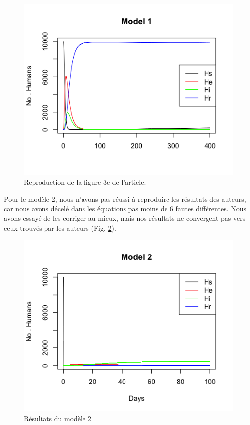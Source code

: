 \documentclass[
  12pt,
  french,
  oneside]{article}
\begin{document}
\begin{figure}
\hypertarget{fig:model1}{%
\centering
\includegraphics{figures/Model1.png}
\caption{Reproduction de la figure 3c de l'article.}\label{fig:model1}
}
\end{figure}

Pour le modèle 2, nous n'avons pas réussi à reproduire les résultats des
auteurs, car nous avons décelé dans les équations pas moins de 6 fautes
différentes. Nous avons essayé de les corriger au mieux, mais nos
résultats ne convergent pas vers ceux trouvés par les auteurs (Fig.
\ref{fig:model2}).

\begin{figure}
\hypertarget{fig:model2}{%
\centering
\includegraphics{figures/Model2.png}
\caption{Résultats du modèle 2}\label{fig:model2}
}
\end{figure}
\end{document}
